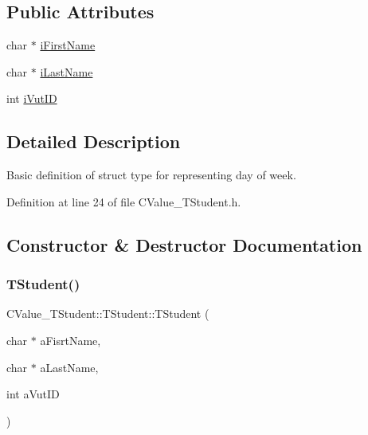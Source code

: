 \subsection*{Public Attributes}
\begin{DoxyCompactItemize}
\item 
char $\ast$ \hyperlink{struct_c_value___t_student_1_1_t_student_a5eb1830e69db30e4e2a54d6bdc3f649f}{i\+First\+Name}
\item 
char $\ast$ \hyperlink{struct_c_value___t_student_1_1_t_student_a00b625fc49750e98e28e9d0d013bba66}{i\+Last\+Name}
\item 
int \hyperlink{struct_c_value___t_student_1_1_t_student_aaf7deea3a78dc217d85b4e23f677150f}{i\+Vut\+ID}
\end{DoxyCompactItemize}


\subsection{Detailed Description}
Basic definition of struct type for representing day of week. 

Definition at line 24 of file C\+Value\+\_\+\+T\+Student.\+h.



\subsection{Constructor \& Destructor Documentation}
\mbox{\label{struct_c_value___t_student_1_1_t_student_ae052eac687165ae925ca2a15bccc9d95}} 
\subsubsection{\texorpdfstring{T\+Student()}{TStudent()}}
{\footnotesize\ttfamily C\+Value\+\_\+\+T\+Student\+::\+T\+Student\+::\+T\+Student (\begin{DoxyParamCaption}\item[{char $\ast$}]{a\+Fisrt\+Name,  }\item[{char $\ast$}]{a\+Last\+Name,  }\item[{int}]{a\+Vut\+ID }\end{DoxyParamCaption})\hspace{0.3cm}{\ttfamily [inline]}}


